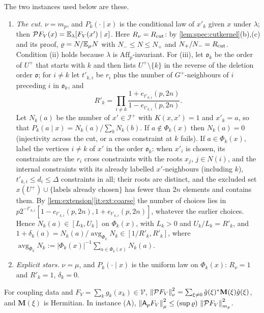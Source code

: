 The two instances used below are these.
\begin{enumerate}[label=\textup{(\Alph*)}]
\item \emph{The cut.} $\nu=m_p$, and $P_k(\cdot\mid x)$ is the conditional law of $x'_k$
  given $x$ under $\lambda$; then $\mathcal PF_V(x)=\mathbb E_\lambda[F_V(x')\mid x]$. Here
  $R_\nu=R_{\mathrm{cut}}$: by \cref{lem:spec:cutkernel}(b),(c) and its proof,
  $\varrho=N/\mathbb E_\mu N$ with $N_-\le N\le N_+$ and $N_+/N_-=R_{\mathrm{cut}}$. Condition
  (ii) holds because $\lambda$ is $\mathrm{Aff}_p$-invariant. For (iii), let
  $\mathfrak o_k$ be the order of $U^+$ that starts with $k$ and then lists
  $U^+\setminus\{k\}$ in the reverse of the deletion order $\mathfrak o$; for
  $i\ne k$ let $t'_{k,i}$ be $r_i$ plus the number of $G^+$-neighbours of $i$
  preceding $i$ in $\mathfrak o_k$, and
  \begin{equation}\label{eq:spec:Rprime}
    R'_k=\prod_{i\ne k}\frac{1+e_{t'_{k,i}}(p,2n)}{1-e_{t'_{k,i}}(p,2n)} .
  \end{equation}
  Let $N_k(a)$ be the number of $x'\in\mathcal I^+$ with $K(x,x')=1$ and $x'_k=a$,
  so that $P_k(a\mid x)=N_k(a)/\sum_bN_k(b)$. If $a\notin\Phi_k(x)$ then
  $N_k(a)=0$ (injectivity across the cut, or a cross constraint at $k$ fails).
  If $a\in\Phi_k(x)$, label the vertices $i\ne k$ of $x'$ in the order
  $\mathfrak o_k$: when $x'_i$ is chosen, its constraints are the $r_i$ cross
  constraints with the roots $x_j$, $j\in N(i)$, and the internal constraints
  with its already labelled $x'$-neighbours (including $k$), $t'_{k,i}\le d_i\le
  \Delta$ constraints in all; their roots are distinct, and the excluded set
  $x(U^+)\cup\{\text{labels already chosen}\}$ has fewer than $2n$ elements and
  contains them. By \cref{lem:extension}\ref{it:ext:coarse} the number of choices
  lies in $p2^{-t'_{k,i}}[1-e_{t'_{k,i}}(p,2n),1+e_{t'_{k,i}}(p,2n)]$, whatever the
  earlier choices. Hence $N_k(a)\in[L_k,U_k]$ on $\Phi_k(x)$, with $L_k>0$ and
  $U_k/L_k=R'_k$, and
  $1+\delta_k(a)=N_k(a)/\operatorname{avg}_{\Phi_k}N_k\in[1/R'_k,R'_k]$,
  where $\operatorname{avg}_{\Phi_k}N_k:=
  |\Phi_k(x)|^{-1}\sum_{a\in\Phi_k(x)}N_k(a)$.
\item \emph{Explicit stars.} $\nu=\mu$, and $P_k(\cdot\mid x)$ is the uniform law on
  $\Phi_k(x)$: $R_\nu=1$ and $R'_k=1$, $\delta_k=0$.
\end{enumerate}

\begin{lemma}\label{lem:coupling-modes}
For coupling data and $F_V=\sum_kg_k(x_k)\in\mathcal V$,
$\left\|\mathcal PF_V\right\|^2_\nu=\sum_{\xi\ne0}\hat g(\xi)^*\mathbf M(\xi)\hat g(\xi)$, and
$\mathbf M(\xi)$ is Hermitian. In instance \textup{(A)},
$\left\|\mathsf A_p F_V\right\|^2_\mu\le(\sup\varrho)\,\left\|\mathcal PF_V\right\|^2_{m_p}$.
\end{lemma}

